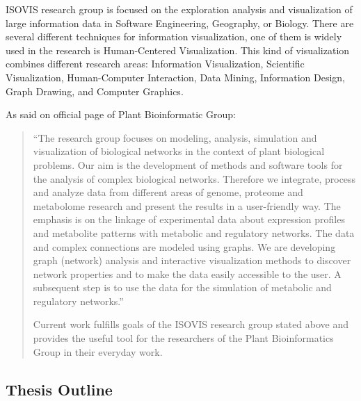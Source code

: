 ISOVIS research group is focused on the exploration analysis and visualization of large information data in Software Engineering, Geography, or Biology. There are several different techniques for information visualization, one of them is widely used in the research is Human-Centered Visualization. This kind of visualization combines different research areas: Information Visualization, Scientific Visualization, Human-Computer Interaction, Data Mining, Information Design, Graph Drawing, and Computer Graphics.


As said on official page of Plant Bioinformatic Group:
\begin{quotation}
``The research group focuses on modeling, analysis, simulation and visualization of biological networks in the context of plant biological problems.
Our aim is the development of methods and software tools for the analysis of complex biological networks.
Therefore we integrate, process and analyze data from different areas of genome, proteome and metabolome research and present the results in a user-friendly way.
The emphasis is on the linkage of experimental data about expression profiles and metabolite patterns with metabolic and regulatory networks.
The data and complex connections are modeled using graphs. We are developing graph (network) analysis and interactive visualization methods to discover network properties and to make the data easily accessible to the user.
A subsequent step is to use the data for the simulation of metabolic and regulatory networks.''~\cite{PBG}

Current work fulfills goals of the ISOVIS research group stated above and provides the useful tool for the researchers of the Plant Bioinformatics Group in their everyday work.

\end{quotation}


\subsection{Thesis Outline}
\label{sec:structure}

